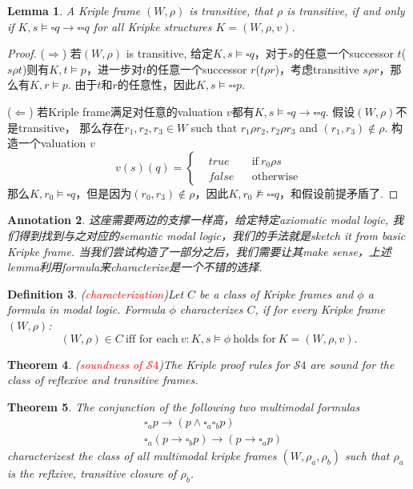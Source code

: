 \documentclass{article}
\theoremstyle{plain}
\newtheorem{theorem}{Theorem}
\newtheorem{lemma}[theorem]{Lemma}
\newtheorem{definition}[theorem]{Definition}
\newtheorem{annotation}[theorem]{Annotation}
\theoremstyle{nonumberplain}
\newtheorem{proof}{Proof}
\newcommand{\redt}[1]{\textcolor{red}{#1}}
\begin{document}
\begin{lemma}
\rm  A Kriple frame $(W,\rho)$ is transitive, that $\rho$ is transitive, if and only if $K,s \vDash \square q \to \square\square q$ for all Kripke structures $K=(W,\rho,v)$. 
\end{lemma}

\begin{proof}
\rm ($\Rightarrow$) 若$(W,\rho)$ is transitive, 给定$K,s \vDash \square q$，对于$s$的任意一个successor $t$($s \rho t$)则有$K,t \vDash p$，进一步对$t$的任意一个successor $r$($t \rho r$)，考虑transitive $s \rho r$，那么有$K,r \vDash p$. 由于$t$和$r$的任意性，因此$K,s \vDash \square\square p$. 

($\Leftarrow$) 若Kriple frame满足对任意的valuation $v$都有$K,s \vDash \square q \to \square\square q$. 假设$(W,\rho)$不是transitive， 那么存在$r_1,r_2,r_3 \in W$ such that $r_1 \rho r_2, r_2 \rho r_3$ and $(r_1,r_3) \notin \rho$. 构造一个valuation $v$
$$
v(s)(q) = \left\{
\begin{aligned}
&true && \text{if}~r_0 \rho s \\
&false && \text{otherwise}
\end{aligned}
\right.
$$
那么$K,r_0 \vDash \square q$，但是因为$(r_0,r_3) \notin \rho$，因此$K, r_0 \nvDash \square\square q$，和假设前提矛盾了. 
\end{proof}

\begin{annotation}
\rm 这座需要两边的支撑一样高，给定特定axiomatic modal logic, 我们得到找到与之对应的semantic modal logic，我们的手法就是sketch it from basic Kripke frame. 当我们尝试构造了一部分之后，我们需要让其make sense，上述lemma利用formula来characterize是一个不错的选择. 
\end{annotation}

\begin{definition}
\rm (\redt{characterization})Let $C$ be a class of Kripke frames and $\phi$ a formula in modal logic.  Formula $\phi$ characterizes $C$, if for every Kripke frame $(W,\rho)$:
$$
(W,\rho) \in C ~\text{iff for each}~v: K,s \vDash \phi~\text{holds for}~K=(W,\rho,v).  
$$
\end{definition}

\begin{theorem}
\rm (\redt{soundness of $\mathcal{S}4$})The Kriple proof rules for $\mathcal{S}4$ are sound for the class of reflexive and transitive frames.
\end{theorem}

\begin{theorem}
\rm The conjunction of the following two multimodal formulas
$$
\begin{aligned}
&\square_a p \to (p \wedge \square_a\square_b p) \\
&\square_a(p \to \square_b p) \to (p \to \square_a p)
\end{aligned}
$$
characterizest the class of all multimodal kripke frames $(W, \rho_a,\rho_b)$ such that $\rho_a$ is the reflxive, transitive closure of $\rho_b$. 
\end{theorem}
\end{document}
